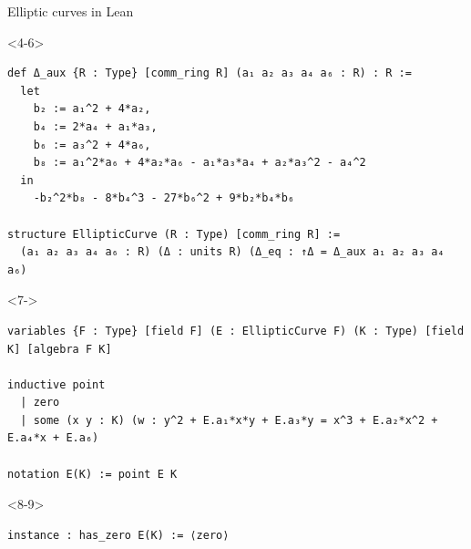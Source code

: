 \documentclass[10pt]{beamer}
\begin{document}
\begin{frame}[fragile, t]{Elliptic curves in Lean}



\begin{onlyenv}<4-6>
\begin{lstlisting}[basicstyle=\scriptsize, frame=single]
def Δ_aux {R : Type} [comm_ring R] (a₁ a₂ a₃ a₄ a₆ : R) : R :=
  let
    b₂ := a₁^2 + 4*a₂,
    b₄ := 2*a₄ + a₁*a₃,
    b₆ := a₃^2 + 4*a₆,
    b₈ := a₁^2*a₆ + 4*a₂*a₆ - a₁*a₃*a₄ + a₂*a₃^2 - a₄^2
  in
    -b₂^2*b₈ - 8*b₄^3 - 27*b₆^2 + 9*b₂*b₄*b₆

structure EllipticCurve (R : Type) [comm_ring R] :=
  (a₁ a₂ a₃ a₄ a₆ : R) (Δ : units R) (Δ_eq : ↑Δ = Δ_aux a₁ a₂ a₃ a₄ a₆)
\end{lstlisting}
\end{onlyenv}




\begin{onlyenv}<7->
\begin{lstlisting}[basicstyle=\scriptsize, frame=single]
variables {F : Type} [field F] (E : EllipticCurve F) (K : Type) [field K] [algebra F K]

inductive point
  | zero
  | some (x y : K) (w : y^2 + E.a₁*x*y + E.a₃*y = x^3 + E.a₂*x^2 + E.a₄*x + E.a₆)

notation E(K) := point E K
\end{lstlisting}
\end{onlyenv}


\begin{onlyenv}<8-9>
\begin{lstlisting}[basicstyle=\scriptsize, frame=single]
instance : has_zero E(K) := ⟨zero⟩
\end{lstlisting}
\end{onlyenv}


\end{frame}
\end{document}
